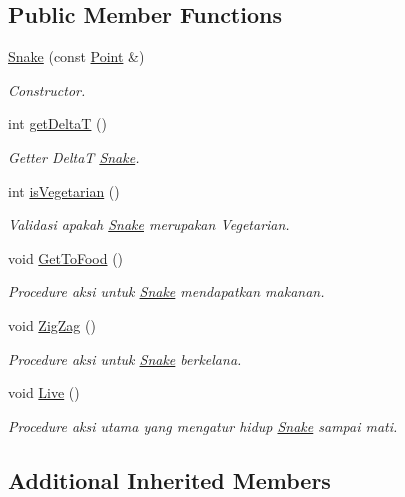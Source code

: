 \subsection*{Public Member Functions}
\begin{DoxyCompactItemize}
\item 
\hyperlink{class_snake_a1c1bfb186b5b74d5b8b2bee282e7273e}{Snake} (const \hyperlink{class_point}{Point} \&)
\begin{DoxyCompactList}\small\item\em Constructor. \end{DoxyCompactList}\item 
int \hyperlink{class_snake_a16c276bca5b03aed618976aeb79d0bdb}{get\+DeltaT} ()
\begin{DoxyCompactList}\small\item\em Getter DeltaT \hyperlink{class_snake}{Snake}. \end{DoxyCompactList}\item 
int \hyperlink{class_snake_a511252859c8eb005b8e4cff200973465}{is\+Vegetarian} ()
\begin{DoxyCompactList}\small\item\em Validasi apakah \hyperlink{class_snake}{Snake} merupakan Vegetarian. \end{DoxyCompactList}\item 
void \hyperlink{class_snake_a605e8e7245842e44f2882395e28b02fe}{Get\+To\+Food} ()
\begin{DoxyCompactList}\small\item\em Procedure aksi untuk \hyperlink{class_snake}{Snake} mendapatkan makanan. \end{DoxyCompactList}\item 
void \hyperlink{class_snake_a3921ed0d6fc728f3e1f920d7d2a67184}{Zig\+Zag} ()
\begin{DoxyCompactList}\small\item\em Procedure aksi untuk \hyperlink{class_snake}{Snake} berkelana. \end{DoxyCompactList}\item 
void \hyperlink{class_snake_a2c340a6cb7f298c2ea7dd1be2c7805fc}{Live} ()
\begin{DoxyCompactList}\small\item\em Procedure aksi utama yang mengatur hidup \hyperlink{class_snake}{Snake} sampai mati. \end{DoxyCompactList}\end{DoxyCompactItemize}
\subsection*{Additional Inherited Members}


